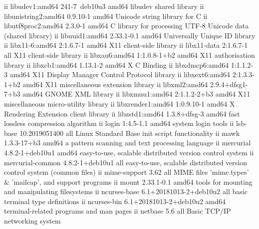 ii  libudev1:amd64             241-7~deb10u3               amd64        libudev shared library
ii  libunistring2:amd64        0.9.10-1                    amd64        Unicode string library for C
ii  libutf8proc2:amd64         2.3.0-1                     amd64        C library for processing UTF-8 Unicode data (shared library)
ii  libuuid1:amd64             2.33.1-0.1                  amd64        Universally Unique ID library
ii  libx11-6:amd64             2:1.6.7-1                   amd64        X11 client-side library
ii  libx11-data                2:1.6.7-1                   all          X11 client-side library
ii  libxau6:amd64              1:1.0.8-1+b2                amd64        X11 authorisation library
ii  libxcb1:amd64              1.13.1-2                    amd64        X C Binding
ii  libxdmcp6:amd64            1:1.1.2-3                   amd64        X11 Display Manager Control Protocol library
ii  libxext6:amd64             2:1.3.3-1+b2                amd64        X11 miscellaneous extension library
ii  libxml2:amd64              2.9.4+dfsg1-7+b3            amd64        GNOME XML library
ii  libxmuu1:amd64             2:1.1.2-2+b3                amd64        X11 miscellaneous micro-utility library
ii  libxrender1:amd64          1:0.9.10-1                  amd64        X Rendering Extension client library
ii  libzstd1:amd64             1.3.8+dfsg-3                amd64        fast lossless compression algorithm
ii  login                      1:4.5-1.1                   amd64        system login tools
ii  lsb-base                   10.2019051400               all          Linux Standard Base init script functionality
ii  mawk                       1.3.3-17+b3                 amd64        a pattern scanning and text processing language
ii  mercurial                  4.8.2-1+deb10u1             amd64        easy-to-use, scalable distributed version control system
ii  mercurial-common           4.8.2-1+deb10u1             all          easy-to-use, scalable distributed version control system (common files)
ii  mime-support               3.62                        all          MIME files 'mime.types' & 'mailcap', and support programs
ii  mount                      2.33.1-0.1                  amd64        tools for mounting and manipulating filesystems
ii  ncurses-base               6.1+20181013-2+deb10u2      all          basic terminal type definitions
ii  ncurses-bin                6.1+20181013-2+deb10u2      amd64        terminal-related programs and man pages
ii  netbase                    5.6                         all          Basic TCP/IP networking system
